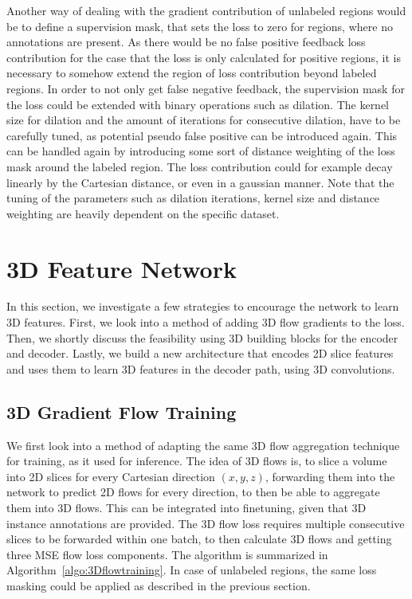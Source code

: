 Another way of dealing with the gradient contribution of unlabeled regions would be to define a supervision mask, that sets the loss to zero for regions, where no annotations are present. As there would be no false positive feedback loss contribution for the case that the loss is only calculated for positive regions, it is necessary to somehow extend the region of loss contribution beyond labeled regions. In order to not only get false negative feedback, the supervision mask for the loss could be extended with binary operations such as dilation. The kernel size for dilation and the amount of iterations for consecutive dilation, have to be carefully tuned, as potential pseudo false positive can be introduced again. This can be handled again by introducing some sort of distance weighting of the loss mask around the labeled region. The loss contribution could for example decay linearly by the Cartesian distance, or even in a gaussian manner. Note that the tuning of the parameters such as dilation iterations, kernel size and distance weighting are heavily dependent on the specific dataset.




\section{3D Feature Network}

In this section, we investigate a few strategies to encourage the network to learn 3D features. First, we look into a method of adding 3D flow gradients to the loss. Then, we shortly discuss the feasibility using 3D building blocks for the encoder and decoder. Lastly, we build a new architecture that encodes 2D slice features and uses them to learn 3D features in the decoder path, using 3D convolutions. 

\subsection{3D Gradient Flow Training}

We first look into a method of adapting the same 3D flow aggregation technique for training, as it used for inference. The idea of 3D flows is, to slice a volume into 2D slices for every Cartesian direction $(x, y, z)$, forwarding them into the network to predict 2D flows for every direction, to then be able to aggregate them into 3D flows. This can be integrated into finetuning, given that 3D instance annotations are provided. The 3D flow loss requires multiple consecutive slices to be forwarded within one batch, to then calculate 3D flows and getting three MSE flow loss components. The algorithm is summarized in Algorithm~\ref{algo:3Dflowtraining}. In case of unlabeled regions, the same loss masking could be applied as described in the previous section.

